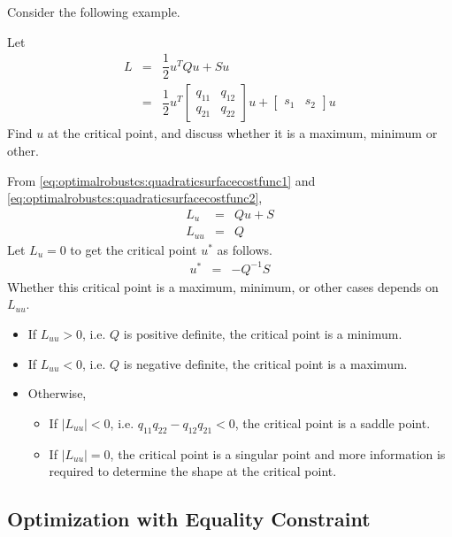 Consider the following example.
\begin{shortbox}

Let
\begin{eqnarray}
	L &=& \dfrac{1}{2}u^TQu + Su \label{eq:optimalrobustcs:quadraticsurfacecostfunc1} \\
	&=& \dfrac{1}{2}u^T\left[\begin{array}{cc}
		q_{11} & q_{12} \\
		q_{21} & q_{22}
	\end{array}\right]u + \left[\begin{array}{cc}
	s_1 & s_2
	\end{array}\right]u \label{eq:optimalrobustcs:quadraticsurfacecostfunc2}
\end{eqnarray}
Find $u$ at the critical point, and discuss whether it is a maximum, minimum or other.

\end{shortbox}

From \eqref{eq:optimalrobustcs:quadraticsurfacecostfunc1} and \eqref{eq:optimalrobustcs:quadraticsurfacecostfunc2},
\begin{eqnarray}
	L_u &=& Qu + S \nonumber \\
	L_{uu} &=& Q \nonumber
\end{eqnarray}
Let $L_u=0$ to get the critical point $u^*$ as follows.
\begin{eqnarray}
	u^* &=& -Q^{-1}S \nonumber
\end{eqnarray}
Whether this critical point is a maximum, minimum, or other cases depends on $L_{uu}$.
\begin{itemize}
	\item If $L_{uu}>0$, i.e. $Q$ is positive definite, the critical point is a minimum.
	\item If $L_{uu}<0$, i.e. $Q$ is negative definite, the critical point is a maximum.
	\item Otherwise, \begin{itemize}
		\item If $|L_{uu}|<0$, i.e. $q_{11}q_{22}-q_{12}q_{21}<0$, the critical point is a saddle point.
		\item If $|L_{uu}|=0$, the critical point is a singular point and more information is required to determine the shape at the critical point.
	\end{itemize}
\end{itemize}

\subsection{Optimization with Equality Constraint}

